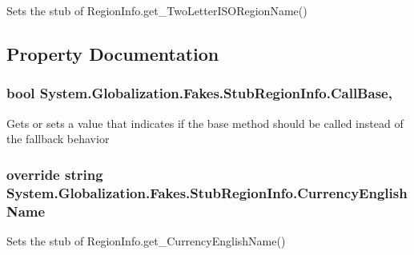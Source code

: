 Sets the stub of Region\-Info.\-get\-\_\-\-Two\-Letter\-I\-S\-O\-Region\-Name()



\subsection{Property Documentation}
\hypertarget{class_system_1_1_globalization_1_1_fakes_1_1_stub_region_info_a81621b535f5662c94a9cd6bf975d5e5d}{
\subsubsection[{Call\-Base}]{\setlength{\rightskip}{0pt plus 5cm}bool System.\-Globalization.\-Fakes.\-Stub\-Region\-Info.\-Call\-Base\hspace{0.3cm}{\ttfamily [get]}, {\ttfamily [set]}}}\label{class_system_1_1_globalization_1_1_fakes_1_1_stub_region_info_a81621b535f5662c94a9cd6bf975d5e5d}


Gets or sets a value that indicates if the base method should be called instead of the fallback behavior

\hypertarget{class_system_1_1_globalization_1_1_fakes_1_1_stub_region_info_a4f2235a2bf5a062ff28401e08380bd05}{
\subsubsection[{Currency\-English\-Name}]{\setlength{\rightskip}{0pt plus 5cm}override string System.\-Globalization.\-Fakes.\-Stub\-Region\-Info.\-Currency\-English\-Name\hspace{0.3cm}{\ttfamily [get]}}}\label{class_system_1_1_globalization_1_1_fakes_1_1_stub_region_info_a4f2235a2bf5a062ff28401e08380bd05}


Sets the stub of Region\-Info.\-get\-\_\-\-Currency\-English\-Name()

